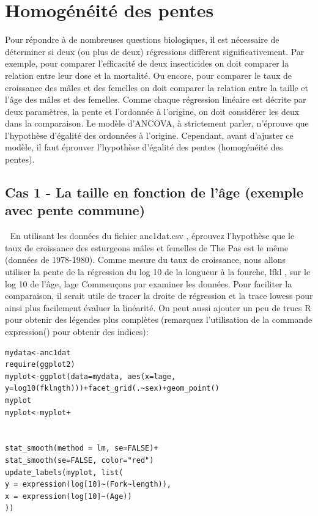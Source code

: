 \documentclass[12pt,]{book}
\begin{document}
\hypertarget{homoguxe9nuxe9ituxe9-des-pentes}{%
\section{Homogénéité des pentes}\label{homoguxe9nuxe9ituxe9-des-pentes}}

Pour répondre à de nombreuses questions biologiques, il est
nécessaire de déterminer si deux (ou plus de deux) régressions
diffèrent significativement. Par exemple, pour comparer l'efficacité de
deux insecticides on doit comparer la relation entre leur dose et la
mortalité. Ou encore, pour comparer le taux de croissance des mâles
et des femelles on doit comparer la relation entre la taille et l'âge des
mâles et des femelles.
Comme chaque régression linéaire est décrite par deux paramètres, la
pente et l'ordonnée à l'origine, on doit considérer les deux dans la
comparaison. Le modèle d'ANCOVA, à strictement parler, n'éprouve
que l'hypothèse d'égalité des ordonnées à l'origine. Cependant, avant
d'ajuster ce modèle, il faut éprouver l'hypothèse d'égalité des pentes
(homogénéité des pentes).

\hypertarget{cas-1---la-taille-en-fonction-de-luxe2ge-exemple-avec-pente-commune}{%
\subsection{Cas 1 - La taille en fonction de l'âge (exemple avec pente commune)}\label{cas-1---la-taille-en-fonction-de-luxe2ge-exemple-avec-pente-commune}}

 En utilisant les données du fichier anc1dat.csv , éprouvez
l'hypothèse que le taux de croissance des esturgeons mâles et femelles
de The Pas est le même (données de 1978-1980). Comme mesure du
taux de croissance, nous allons utiliser la pente de la régression du
log 10 de la longueur à la fourche, lfkl , sur le log 10 de l'âge, lage
Commençons par examiner les données. Pour faciliter la comparaison,
il serait utile de tracer la droite de régression et la trace lowess pour
ainsi plus facilement évaluer la linéarité. On peut aussi ajouter un peu
de trucs R pour obtenir des légendes plus complètes (remarquez
l'utilisation de la commande expression() pour obtenir des indices):

\begin{verbatim}
mydata<-anc1dat
require(ggplot2)
myplot<-ggplot(data=mydata, aes(x=lage,
y=log10(fklngth)))+facet_grid(.~sex)+geom_point()
myplot
myplot<-myplot+


stat_smooth(method = lm, se=FALSE)+
stat_smooth(se=FALSE, color="red")
update_labels(myplot, list(
y = expression(log[10]~(Fork~length)),
x = expression(log[10]~(Age))
))
\end{verbatim}
\end{document}

